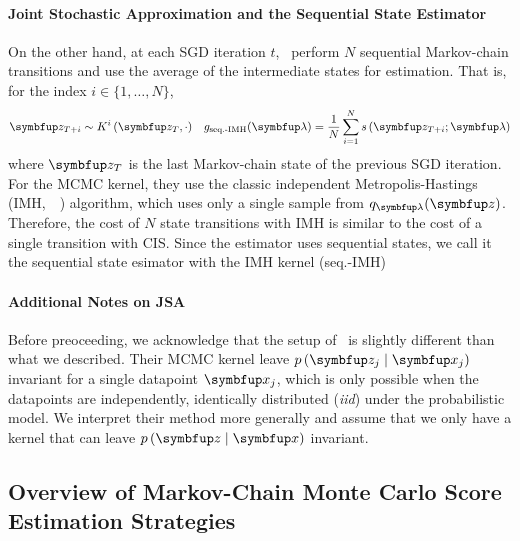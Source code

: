 \vspace{-0.05in}
\paragraph{Joint Stochastic Approximation and the Sequential State Estimator}
On the other hand, at each SGD iteration \(t\),~\citep{pmlr-v124-ou20a} perform \(N\) sequential Markov-chain transitions and use the average of the intermediate states for estimation.
That is, for the index \(i \in \{1, \ldots, N\}\),
\vspace{-0.05in}
\begin{align}
  &\vz_{T+i} \sim K^i\left(\vz_{T}, \cdot \right) &g_{\text{seq.-IMH}}(\vlambda) = \frac{1}{N} \sum_{i=1}^N s\,(\vz_{T+i}; \vlambda)
\end{align}
where \(\vz_T\) is the last Markov-chain state of the previous SGD iteration.
For the MCMC kernel, they use the classic independent Metropolis-Hastings (IMH,~\citealt[Algorithm 25]{robert_monte_2004}~\citealt{hastings_monte_1970}) algorithm, which uses only a single sample from \(q_{\vlambda}(\vz)\).
Therefore, the cost of \(N\) state transitions with IMH is similar to the cost of a single transition with CIS.
Since the estimator uses sequential states, we call it the sequential state esimator with the IMH kernel (seq.-IMH)

\vspace{-0.05in}
\paragraph{Additional  Notes on JSA}
Before preoceeding, we acknowledge that the setup of~\citet{pmlr-v124-ou20a} is slightly different than what we described.
Their MCMC kernel leave \(p\left(\vz_j\mid\vx_j \right)\) invariant for a single datapoint \(\vx_j\), which is only possible when the datapoints are independently, identically distributed (\textit{iid}) under the probabilistic model.
We interpret their method more generally and assume that we only have a kernel that can leave \(p\left(\vz\mid\vx \right)\) invariant.

\subsection{Overview of Markov-Chain Monte Carlo Score Estimation Strategies}\label{section:overview}

